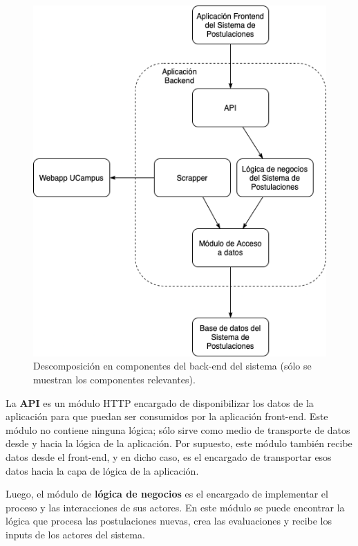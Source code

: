 \begin{figure}[!ht]
    \begin{center}
        \includegraphics[scale=0.5]{imagenes/03-descomposicion-backend.png}
    \end{center}
    \caption{Descomposición en componentes del back-end del sistema (sólo se muestran los componentes relevantes).}
    \label{fig:descomposicion-backend}
\end{figure}

La \textbf{API} es un módulo HTTP encargado de disponibilizar los datos de la
aplicación para que puedan ser consumidos por la aplicación front-end. Este
módulo no contiene ninguna lógica; sólo sirve como medio de transporte de datos
desde y hacia la lógica de la aplicación. Por supuesto, este módulo también
recibe datos desde el front-end, y en dicho caso, es el encargado de transportar
esos datos hacia la capa de lógica de la aplicación.

Luego, el módulo de \textbf{lógica de negocios} es el encargado de implementar
el proceso y las interacciones de sus actores. En este módulo se puede encontrar
la lógica que procesa las postulaciones nuevas, crea las evaluaciones y recibe
los inputs de los actores del sistema.


